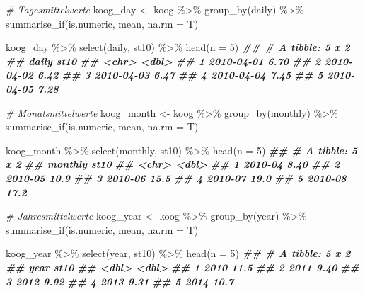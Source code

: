 \documentclass[
]{article}
\newenvironment{Shaded}{\begin{snugshade}}{\end{snugshade}}
\newcommand{\AttributeTok}[1]{\textcolor[rgb]{0.77,0.63,0.00}{#1}}
\newcommand{\CommentTok}[1]{\textcolor[rgb]{0.56,0.35,0.01}{\textit{#1}}}
\newcommand{\DecValTok}[1]{\textcolor[rgb]{0.00,0.00,0.81}{#1}}
\newcommand{\DocumentationTok}[1]{\textcolor[rgb]{0.56,0.35,0.01}{\textbf{\textit{#1}}}}
\newcommand{\FunctionTok}[1]{\textcolor[rgb]{0.00,0.00,0.00}{#1}}
\newcommand{\NormalTok}[1]{#1}
\newcommand{\OtherTok}[1]{\textcolor[rgb]{0.56,0.35,0.01}{#1}}
\newcommand{\SpecialCharTok}[1]{\textcolor[rgb]{0.00,0.00,0.00}{#1}}
\begin{document}
\begin{Shaded}
\begin{Highlighting}[]
\CommentTok{\# Tagesmittelwerte}
\NormalTok{koog\_day }\OtherTok{\textless{}{-}}\NormalTok{ koog }\SpecialCharTok{\%\textgreater{}\%}
  \FunctionTok{group\_by}\NormalTok{(daily) }\SpecialCharTok{\%\textgreater{}\%}
  \FunctionTok{summarise\_if}\NormalTok{(is.numeric, mean, }\AttributeTok{na.rm =}\NormalTok{ T)}

\NormalTok{koog\_day }\SpecialCharTok{\%\textgreater{}\%}
  \FunctionTok{select}\NormalTok{(daily, st10) }\SpecialCharTok{\%\textgreater{}\%}
  \FunctionTok{head}\NormalTok{(}\AttributeTok{n =} \DecValTok{5}\NormalTok{)}
\DocumentationTok{\#\# \# A tibble: 5 x 2}
\DocumentationTok{\#\#   daily       st10}
\DocumentationTok{\#\#   \textless{}chr\textgreater{}      \textless{}dbl\textgreater{}}
\DocumentationTok{\#\# 1 2010{-}04{-}01  6.70}
\DocumentationTok{\#\# 2 2010{-}04{-}02  6.42}
\DocumentationTok{\#\# 3 2010{-}04{-}03  6.47}
\DocumentationTok{\#\# 4 2010{-}04{-}04  7.45}
\DocumentationTok{\#\# 5 2010{-}04{-}05  7.28}

\CommentTok{\# Monatsmittelwerte}
\NormalTok{koog\_month }\OtherTok{\textless{}{-}}\NormalTok{ koog }\SpecialCharTok{\%\textgreater{}\%}
  \FunctionTok{group\_by}\NormalTok{(monthly) }\SpecialCharTok{\%\textgreater{}\%}
  \FunctionTok{summarise\_if}\NormalTok{(is.numeric, mean, }\AttributeTok{na.rm =}\NormalTok{ T)}

\NormalTok{koog\_month }\SpecialCharTok{\%\textgreater{}\%}
  \FunctionTok{select}\NormalTok{(monthly, st10) }\SpecialCharTok{\%\textgreater{}\%}
  \FunctionTok{head}\NormalTok{(}\AttributeTok{n =} \DecValTok{5}\NormalTok{)}
\DocumentationTok{\#\# \# A tibble: 5 x 2}
\DocumentationTok{\#\#   monthly  st10}
\DocumentationTok{\#\#   \textless{}chr\textgreater{}   \textless{}dbl\textgreater{}}
\DocumentationTok{\#\# 1 2010{-}04  8.40}
\DocumentationTok{\#\# 2 2010{-}05 10.9 }
\DocumentationTok{\#\# 3 2010{-}06 15.5 }
\DocumentationTok{\#\# 4 2010{-}07 19.0 }
\DocumentationTok{\#\# 5 2010{-}08 17.2}

\CommentTok{\# Jahresmittelwerte}
\NormalTok{koog\_year }\OtherTok{\textless{}{-}}\NormalTok{ koog }\SpecialCharTok{\%\textgreater{}\%}
  \FunctionTok{group\_by}\NormalTok{(year) }\SpecialCharTok{\%\textgreater{}\%}
  \FunctionTok{summarise\_if}\NormalTok{(is.numeric, mean, }\AttributeTok{na.rm =}\NormalTok{ T)}

\NormalTok{koog\_year }\SpecialCharTok{\%\textgreater{}\%}
  \FunctionTok{select}\NormalTok{(year, st10) }\SpecialCharTok{\%\textgreater{}\%}
  \FunctionTok{head}\NormalTok{(}\AttributeTok{n =} \DecValTok{5}\NormalTok{)}
\DocumentationTok{\#\# \# A tibble: 5 x 2}
\DocumentationTok{\#\#    year  st10}
\DocumentationTok{\#\#   \textless{}dbl\textgreater{} \textless{}dbl\textgreater{}}
\DocumentationTok{\#\# 1  2010 11.5 }
\DocumentationTok{\#\# 2  2011  9.40}
\DocumentationTok{\#\# 3  2012  9.92}
\DocumentationTok{\#\# 4  2013  9.31}
\DocumentationTok{\#\# 5  2014 10.7}
\end{Highlighting}
\end{Shaded}
\end{document}
